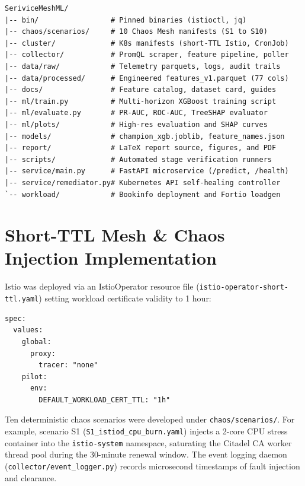 \documentclass[12pt,a4paper]{report}
\newcommand{\code}[1]{\texttt{\small #1}}
\begin{document}
\begin{footnotesize}
\begin{verbatim}
SeriviceMeshML/
|-- bin/                 # Pinned binaries (istioctl, jq)
|-- chaos/scenarios/     # 10 Chaos Mesh manifests (S1 to S10)
|-- cluster/             # K8s manifests (short-TTL Istio, CronJob)
|-- collector/           # PromQL scraper, feature pipeline, poller
|-- data/raw/            # Telemetry parquets, logs, audit trails
|-- data/processed/      # Engineered features_v1.parquet (77 cols)
|-- docs/                # Feature catalog, dataset card, guides
|-- ml/train.py          # Multi-horizon XGBoost training script
|-- ml/evaluate.py       # PR-AUC, ROC-AUC, TreeSHAP evaluator
|-- ml/plots/            # High-res evaluation and SHAP curves
|-- models/              # champion_xgb.joblib, feature_names.json
|-- report/              # LaTeX report source, figures, and PDF
|-- scripts/             # Automated stage verification runners
|-- service/main.py      # FastAPI microservice (/predict, /health)
|-- service/remediator.py# Kubernetes API self-healing controller
`-- workload/            # Bookinfo deployment and Fortio loadgen
\end{verbatim}
\end{footnotesize}

\section{Short-TTL Mesh \& Chaos Injection Implementation}
Istio was deployed via an IstioOperator resource file (\texttt{istio-}\allowbreak\texttt{operator-}\allowbreak\texttt{short-}\allowbreak\texttt{ttl.yaml}) setting workload certificate validity to 1 hour:
\begin{footnotesize}
\begin{verbatim}
spec:
  values:
    global:
      proxy:
        tracer: "none"
    pilot:
      env:
        DEFAULT_WORKLOAD_CERT_TTL: "1h"
\end{verbatim}
\end{footnotesize}

Ten deterministic chaos scenarios were developed under \code{chaos/scenarios/}. For example, scenario S1 (\code{S1\_istiod\_cpu\_burn.yaml}) injects a 2-core CPU stress container into the \code{istio-system} namespace, saturating the Citadel CA worker thread pool during the 30-minute renewal window. The event logging daemon (\code{collector/event\_logger.py}) records microsecond timestamps of fault injection and clearance.
\end{document}
